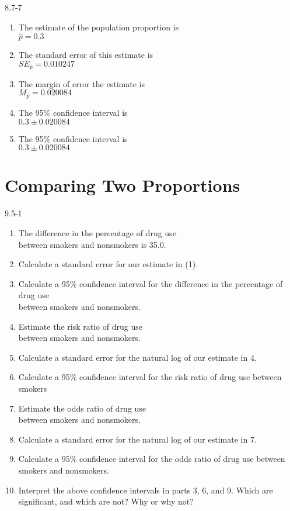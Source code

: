 \begin{exsol@solution}{8.7-7}

\begin{enumerate}
\item	The estimate of the population proportion is \\ $\hat{p} = 0.3$
\item	The standard error of this estimate is \\ $SE_{\hat{p}} = 0.010247$
\item The margin of error the estimate is \\ $M_{\hat{p}} = 0.020084$
\item	The 95\% confidence interval is \\ $0.3 \pm 0.020084$
\item	The 95\% confidence interval is \\ $0.3 \pm 0.020084$
\end{enumerate}
\end{exsol@solution}
\setcounter{chapter}{9}\chapter{Comparing Two Proportions }
\begin{exsol@solution}{9.5-1}


\begin{enumerate}
\item The difference in the percentage of drug use \\ between smokers and nonsmokers is 35.0.
\item Calculate a standard error for our estimate in (1).
\item Calculate a 95\% confidence interval for the difference in the percentage of drug use \\ between smokers and nonsmokers.
\item Estimate the risk ratio of drug use \\ between smokers and nonsmokers.
\item Calculate a standard error for the natural log of our estimate in 4.
\item Calculate a 95\% confidence interval for the risk ratio of drug use between smokers
\item Estimate the odds ratio of drug use \\ between smokers and nonsmokers.
\item Calculate a standard error for the natural log of our estimate in 7.
\item Calculate a 95\% confidence interval for the odds ratio of drug use between smokers and nonsmokers.
\item Interpret the above confidence intervals in parts 3, 6, and 9. Which are significant, and which are not? Why or why not?
\end{enumerate}

\end{exsol@solution}
